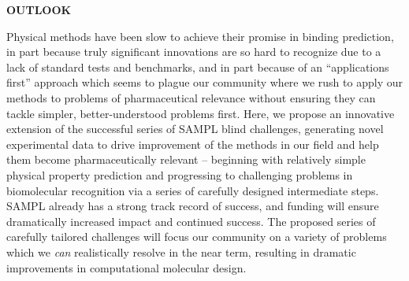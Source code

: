 \documentclass[11pt]{article}
\begin{document}
{\large \bf OUTLOOK} %

Physical methods have been slow to achieve their promise in binding prediction, in part because truly significant innovations are so hard to recognize due to a lack of standard tests and benchmarks, and in part because of an ``applications first'' approach which seems to plague our community where we rush to apply our methods to problems of pharmaceutical relevance without ensuring they can tackle simpler, better-understood problems first.
Here, we propose an innovative extension of the successful series of SAMPL blind challenges, generating novel experimental data to drive improvement of the methods in our field and help them become pharmaceutically relevant -- beginning with relatively simple physical property prediction and progressing to challenging problems in biomolecular recognition via a series of carefully designed intermediate steps.
SAMPL already has a strong track record of success, and funding will ensure dramatically increased impact and continued success.
The proposed series of carefully tailored challenges will focus our community on a variety of problems which we \emph{can} realistically resolve in the near term, resulting in dramatic improvements in computational molecular design.


\eject

%

%

\eject

\end{document}
